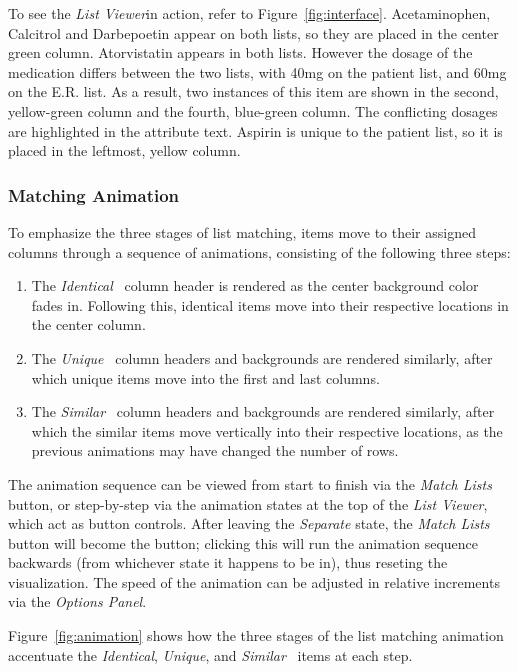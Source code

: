 \documentclass{chi2009}
\newcommand{\ListViewer}{\textit{List Viewer}}
\newcommand{\Options}{\textit{Options Panel}}
\newcommand{\Similar}{\textit{Similar}}
\newcommand{\Identical}{\textit{Identical}}
\newcommand{\Unique}{\textit{Unique}}
\begin{document}
To see the \ListViewer in action, refer to Figure~\ref{fig:interface}. Acetaminophen, Calcitrol and Darbepoetin appear on both lists, so they are placed in the center green column. Atorvistatin appears in both lists. However the dosage of the medication differs between the two lists, with 40mg on the patient list, and 60mg on the E.R. list. As a result, two instances of this item are shown in the second, yellow-green column and the fourth, blue-green column. The conflicting dosages are highlighted in the attribute text. Aspirin is unique to the patient list, so it is placed in the leftmost, yellow column.

\subsubsection{Matching Animation}
To emphasize the three stages of list matching, items move to their assigned columns through a sequence of animations, consisting of the following three steps:
\begin{enumerate}
\item The \Identical~ column header is rendered as the center background color fades in. Following this, identical items move into their respective locations in the center column.
\item The \Unique~ column headers and backgrounds are rendered similarly, after which unique items move into the first and last columns.
\item The \Similar~ column headers and backgrounds are rendered similarly, after which the similar items move vertically into their respective locations, as the previous animations may have changed the number of rows.
\end{enumerate}

The animation sequence can be viewed from start to finish via the \textit{Match Lists} button, or step-by-step via the animation states at the top of the \ListViewer, which act as button controls. After leaving the \textit{Separate} state, the \textit{Match Lists} button will become the  button; clicking this will run the animation sequence backwards (from whichever state it happens to be in), thus reseting the visualization. The speed of the animation can be adjusted in relative increments via the \Options.

Figure~\ref{fig:animation} shows how the three stages of the list matching animation accentuate the \Identical, \Unique, and \Similar~ items at each step.
\end{document}
